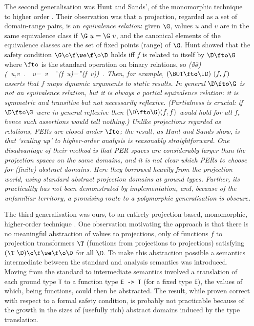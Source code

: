 \begin{article}
The second generalisation was Hunt and Sands', of the monomorphic
technique to higher order \cite{HS91}.  Their observation was that a
projection, regarded as a set of domain-range pairs, is an {\it
equivalence relation\/}: given $\G$, values $u$ and $v$ are in the
same equivalence class if $\G~u=\G~v$, and the canonical elements of
the equivalence classes are the set of fixed points (range) of $\G$.
Hunt showed that the safety condition $\G\o\f\we\f\o\D$ holds iff $f$
is related to itself by $\D\fto\G$ where $\fto$ is the standard
operation on binary relations, so 
\beqs
\it (\G\o\f\we\f\o\D)\Leftrightarrow(\forall\ u,v\ .\ \D\ u=\D\ v\ \Rightarrow\ \G\ (f\ u)=\G\ (f\ v))\ .
\eeqs
Then, for example, $(\BOT\fto\ID)~(f,f)$ asserts
that $f$ maps dynamic arguments to static results.  In general
$\D\fto\G$ is not an equivalence relation, but it is always a {\it
partial\/} equivalence relation: it is symmetric and transitive but
not necessarily reflexive.  (Partialness is crucial: if $\D\fto\G$
were in general reflexive then $(\D\fto\G)(f,f)$ would hold for all
$f$, hence such assertions would tell nothing.)  Unlike projections
regarded as relations, PERs are closed under $\fto$; the result, as
Hunt and Sands show, is that `scaling up' to higher-order analysis is
reasonably straightforward.  One disadvantage of their method is that
PER spaces are considerably larger than the projection spaces on the
same domains, and it is not clear which PERs to choose for (finite)
abstract domains.  Here they borrowed heavily from the projection
world, using standard abstract projection domains at ground types.
Further, its practicality has not been demonstrated by implementation,
and, because of the unfamiliar territory, a promising route to a
polymorphic generalisation is obscure.

The third generalisation was ours, to an entirely projection-based,
monomorphic, higher-order technique \cite{Dav93b}.  One observation
motivating the approach is that there is no meaningful abstraction of
values to projections, only of functions $f$ to projection
transformers $\T$ (functions from projections to projections)
satisfying $(\T~\D)\o\f\we\f\o\D$ for all $\D$.  To make this
abstraction possible a semantics intermediate between the standard and
analysis semantics was introduced.  Moving from the standard to
intermediate semantics involved a translation of each ground type \mbox{\tt T}
to a function type \mbox{\tt E}\ \mbox{\tt ->}\ \mbox{\tt T} (for a fixed type \mbox{\tt E}), the values
of which, being functions, could then be abstracted.  The result,
while proven correct with respect to a formal safety condition, is
probably not practicable because of the growth in the sizes of
(usefully rich) abstract domains induced by the type translation.


\end{article}
